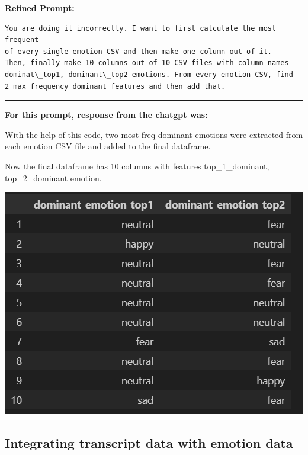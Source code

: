 \documentclass[11pt,a4paper]{article}
\begin{document}
\textbf{Refined Prompt:}
\begin{verbatim}
You are doing it incorrectly. I want to first calculate the most frequent 
of every single emotion CSV and then make one column out of it. 
Then, finally make 10 columns out of 10 CSV files with column names 
dominat\_top1, dominant\_top2 emotions. From every emotion CSV, find 
2 max frequency dominant features and then add that.
\end{verbatim}
\begin{center}
    \color{red}\rule{1\linewidth}{0.5mm}
\end{center}


\textbf{For this prompt, response from the chatgpt was:}
\begin{tcolorbox}[breakable, colback=gray!5, colframe=gray!50!black]

\end{tcolorbox}

\large{With the help of this code, two most freq dominant emotions were extracted from each emotion CSV file and added to the final dataframe.\\}

\large{

Now the final dataframe has 10 columns with features top\_1\_dominant, top\_2\_dominant emotion.}
\begin{center}
    \includegraphics[width=1\columnwidth]{images_prompts/dominant_emotion.png}
\end{center}

\subsection{Integrating transcript data with emotion data}
\end{document}
